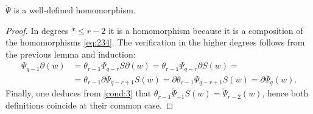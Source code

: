 \begin{lemma}
	$\check{\Psi}$ is a well-defined homomorphism. %
\end{lemma}

\begin{proof}
	In degrees $*\leq r-2$ it is a homomorphism because it is a composition of the homomorphisms \eqref{eq:234}. The verification in the higher degrees follows from the previous lemma and induction:
	\begin{align*}
		\Psi_{q-1}\partial(w) &= \theta_{r-1}\Psi_{q-r}S\partial(w) = \theta_{r-1}\Psi_{q-r}\partial S(w) = \\
		&=\theta_{r-1}\partial\Psi_{q-r+1}S(w) = \partial\theta_{r-1}\Psi_{q-r+1}S(w) = \partial \Psi_{q}(w).
	\end{align*}
	Finally, one deduces from \eqref{cond:3} that $\theta_{r-1}\check{\Psi}_{-1}S(w) = \check{\Psi}_{r-2}(w)$, hence both definitions coincide at their common case.
\end{proof}

%

